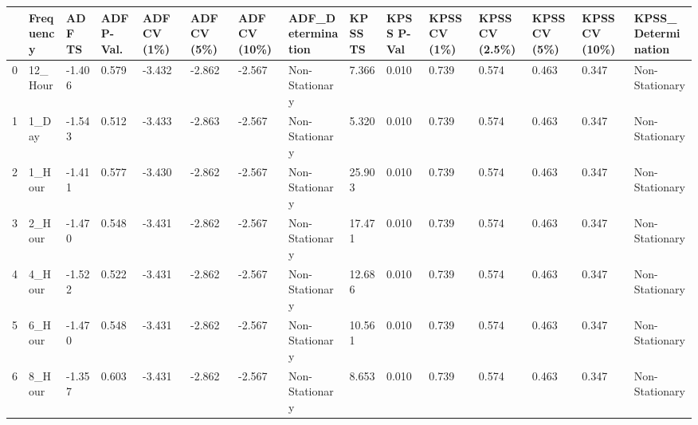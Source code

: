 \begin{tabular}{lllllllllllllll}
\toprule
 & Frequency & ADF TS & ADF P-Val. & ADF CV (1\%) & ADF CV (5\%) & ADF CV (10\%) & ADF_Determination & KPSS TS & KPSS P-Val & KPSS CV (1\%) & KPSS CV (2.5\%) & KPSS CV (5\%) & KPSS CV (10\%) & KPSS_Determination \\
\midrule
0 & 12_Hour & -1.406 & 0.579 & -3.432 & -2.862 & -2.567 & Non-Stationary & 7.366 & 0.010 & 0.739 & 0.574 & 0.463 & 0.347 & Non-Stationary \\
1 & 1_Day & -1.543 & 0.512 & -3.433 & -2.863 & -2.567 & Non-Stationary & 5.320 & 0.010 & 0.739 & 0.574 & 0.463 & 0.347 & Non-Stationary \\
2 & 1_Hour & -1.411 & 0.577 & -3.430 & -2.862 & -2.567 & Non-Stationary & 25.903 & 0.010 & 0.739 & 0.574 & 0.463 & 0.347 & Non-Stationary \\
3 & 2_Hour & -1.470 & 0.548 & -3.431 & -2.862 & -2.567 & Non-Stationary & 17.471 & 0.010 & 0.739 & 0.574 & 0.463 & 0.347 & Non-Stationary \\
4 & 4_Hour & -1.522 & 0.522 & -3.431 & -2.862 & -2.567 & Non-Stationary & 12.686 & 0.010 & 0.739 & 0.574 & 0.463 & 0.347 & Non-Stationary \\
5 & 6_Hour & -1.470 & 0.548 & -3.431 & -2.862 & -2.567 & Non-Stationary & 10.561 & 0.010 & 0.739 & 0.574 & 0.463 & 0.347 & Non-Stationary \\
6 & 8_Hour & -1.357 & 0.603 & -3.431 & -2.862 & -2.567 & Non-Stationary & 8.653 & 0.010 & 0.739 & 0.574 & 0.463 & 0.347 & Non-Stationary \\
\bottomrule
\end{tabular}
